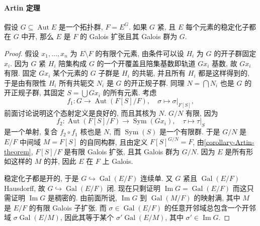 \paragraph{Artin 定理}

\begin{proposition}[Artin]
  假设 \( G \subseteq \operatorname{Aut} E \) 是一个拓扑群, \( F = E^G \).
  如果 \( G \) 紧, 且 \( E \) 每个元素的稳定化子都在 \( G \) 中开, 那么 \( E \)
  是 \( F \) 的 Galois 扩张且其 Galois 群为 \( G \).
\end{proposition}
\begin{proof}
  假设 \( x_1, \ldots, x_n \) 为 \( E \setminus F \) 的有限个元素, 由条件可以设
  \( H_i \) 为 \( G \) 的开子群固定 \( x_i \).
  因为 \( G \) 紧 \( H_i \) 陪集构成 \( G \) 的一个开覆盖且陪集基数即轨道 \(
  Gx_i \) 基数, 故 \( Gx_i \) 有限.
  固定 \( Gx_i \) 某个元素的 \( G \) 子群是 \( H_i \) 的共轭, 并且所有 \( H_i \)
  都是这样得到的, 于是由有限性 \( H_i \) 所有共轭交 \( N_i \) 是 \( G \)
  的开正规子群.
  同理 \( N = \bigcap N_i \) 也是 \( G \) 的开正规子群, 其固定 \( S = \bigcup
  Gx_i \) 的所有元素.
  考虑
  \[
    f_1: G \to \operatorname{Aut}(F[S]/F),\quad \sigma \mapsto
    \left. \sigma \right\vert_{F[S]},
  \]
  前面讨论说明这个态射定义是良好的, 而且其核为 \( N \).
  \( G/N \) 有限, 因为
  \[
    f_2: \operatorname{Aut}(F[S]/F) \to \operatorname{Sym}(Gx_i),\quad \tau
    \mapsto \left. \tau \right\vert_{S}
  \]
  是一个单射, 复合 \( f_2 \circ f_1 \) 核也是 \( N \), 而 \(
  \operatorname{Sym}(S) \) 是一个有限群.
  于是 \( G / N \) 是 \( E/F \) 中间域 \( M = F[S] \) 的自同构群, 且由定义 \(
  F[S]^{G/N} = F \), 由\cref{corollary-Artin-theorem}, \( F[S]/F \) 是有限
  Galois 扩张, 且其 Galois 群为 \( G/N \).
  因为 \( E \) 是所有形如这样的 \( M \) 的并, 因此 \( E \) 在 \( F \) 上 Galois.

  稳定化子都是开的, 于是 \( G \hookrightarrow \operatorname{Gal}(E/F) \) 连续单.
  又 \( G \) 紧且 \( \operatorname{Gal}(E/F) \) Hausdorff, 故 \( G
  \hookrightarrow \operatorname{Gal}(E/F) \) 闭.
  现在只剩证明 \( \operatorname{Im} G = \operatorname{Gal}(E/F) \) 而这只需证明
  \( \operatorname{Im} G \) 是稠密的.
  由前面所说, \( \operatorname{Im}G \) 到 \( \operatorname{Gal}(M/F) \)
  的映射满, 其中 \( M \) 是 \( E/F \) 的有限 Galois 子扩张.
  而 \( \sigma \in \operatorname{Gal}(E/F) \) 的任意开邻域总包含一个开邻域 \(
  \sigma \operatorname{Gal}(E/M) \), 因此其等于某个 \( \sigma'
  \operatorname{Gal}(E/M) \), 其中 \( \sigma' \in \operatorname{Im} G \).
\end{proof}

